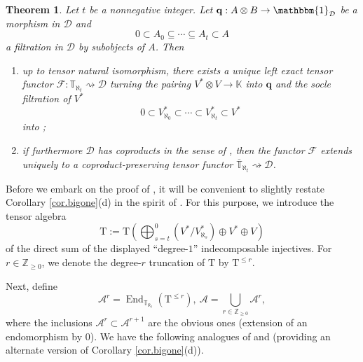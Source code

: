 \documentclass[11pt]{article}
\renewcommand{\labelenumi}{(\arabic{enumi})}
\theoremstyle{plain}
\newtheorem{theorem}[lemma]{Theorem}
\theoremstyle{nonumberplain}
\theoremstyle{plain}
\theoremstyle{nonumberplain}
\newcommand\bK{\mathbb K}
\newcommand\bT{\mathbb T}
\newcommand\cA{\mathcal A}
\newcommand\cD{\mathcal D}
\DeclareMathOperator{\End}{\mathrm{End}}
\begin{document}
\begin{theorem}\label{th.univ}
  Let $t$ be a nonnegative integer. Let $\mathbf{q}:A\otimes B\to \mathbbm{1}_\cD$ be a morphism in $\cD$ and 
  \begin{equation}\label{eq:filt-x}
    0\subset A_0\subseteq\cdots\subseteq A_{t}\subset A
  \end{equation}
a filtration in $\cD$ by subobjects of $A$. Then
\begin{enumerate}
\renewcommand{\labelenumi}{(\alph{enumi})}
\item up to tensor natural isomorphism, there exists a unique left
  exact tensor functor $\mathcal{F}:\bT_{\aleph_t}  \rightsquigarrow \cD$ turning the pairing
  $V^*\otimes V\to \bK$ into $\mathbf{q}$ and the socle filtration of $V^*$
  \begin{equation*}
    0\subset V^*_{\aleph_0}\subset\cdots\subset V^*_{\aleph_{t}}\subset V^*
  \end{equation*}
  into ;
\item if furthermore $\cD$ has coproducts in the sense of
  , then the functor $\mathcal{F}$ extends uniquely to a
  coproduct-preserving tensor functor
  $\overline{\bT}_{\aleph_t}  \rightsquigarrow \cD$.
\end{enumerate}
\end{theorem}


Before we embark on the proof of , it will
be convenient to slightly restate Corollary \ref{cor.bigone}(d) in
the spirit of \cite[$\S$3.4]{us2}. For this purpose, we introduce
the tensor algebra
\begin{equation*}
  \mathrm{T}:=\mathrm{T}\left(\bigoplus_{s=t}^0(V^*/V_{\aleph_s}^*)\oplus V^*\oplus V\right) 
\end{equation*}
of the direct sum of the displayed ``degree-$1$'' indecomposable injectives. For $r\in\mathbb{Z}_{\geq 0}$, we
denote the degree-$r$ truncation of $\mathrm{T}$ by
$\mathrm{T}^{\le r}$.

Next, define 
\begin{equation*}
  \cA^r=\End_{\bT_{\aleph_t}}(\mathrm{T}^{\le r}),\ \cA=\bigcup_{r\in\mathbb{Z}_{\geq 0}} \cA^r,
\end{equation*}
where the inclusions $\cA^r\subset \cA^{r+1}$ are the obvious
ones (extension of an endomorphism by $0$). We have the following analogues of \cite[Definition 3.18]{us2}
and \cite[Theorem 3.19]{us2} (providing an alternate version of
Corollary \ref{cor.bigone}(d)).
\end{document}
